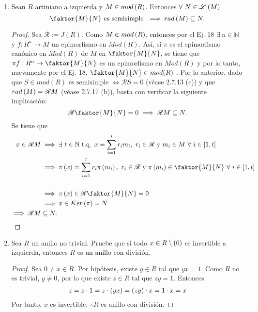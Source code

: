 \documentclass{article}
\begin{document}
\begin{enumerate}[label=\textbf{Ej \arabic*.}]
		\item Sean $R$ artiniano a izquierda y $M\in mod\left(R\right)$. Entonces
		$\forall\ N\in\genlin{M}$ 
		\begin{equation*}
			\faktor{M}{N}\text{ es semisimple }\implies rad\lrprth{M}\subseteq N.
		\end{equation*}
		\begin{proof}
			Sea $\mathscr{R}:=J(R)$. Como $M\in mod\left(R\right)$, entonces por el Ej. 18 $\exists\ n\in\mathbb{N}$ y $f:R^n\to M$ un epimorfismo en  $Mod(R)$. Así, sí $\pi$ es el epimorfismo canónico en $Mod(R)$ de $M$ en $\faktor{M}{N}$, se tiene que $\pi f:R^n\to \faktor{M}{N}$ es un epimorfismo en $Mod(R)$ y por lo tanto, nuevamente por el Ej. 18, $\faktor{M}{N}\in mod(R)$ . Por lo anterior, dado que $S\in mod(R)\text{ es semisimple }\iff \mathscr{R}S=0$ (véase 2.7.13 (c)) y que $rad\left(M\right)=\mathscr{R}M$ (véase 2.7.17 (b)), basta con verificar la siguiente implicación:
			\begin{equation*}
				\mathscr{R}\faktor{M}{N}=0\implies \mathscr{R} M\subseteq N.
			\end{equation*}
			Se tiene que
			\begin{align*}
				x\in\mathscr{R}M&\implies \exists\ t\in\mathbb{N}\text{ t.q. } x=\sum\limits_{i=1}^{t}r_im_i,\ r_i\in\mathscr{R}\text{ y } m_i\in M\ \forall\ i\in[1,t]\\
				&\implies \pi\lrprth{x}=\sum\limits_{i=1}^{t}r_i\pi\lrprth{m_i},\ r_i\in\mathscr{R}\text{ y } \pi\lrprth{m_i}\in \faktor{M}{N}\ \forall\ i\in[1,t]\\\\
				&\implies \pi\lrprth{x}\in\mathscr{R}\faktor{M}{N}=0\\
				&\implies x\in Ker\lrprth{\pi}=N.\\
				\implies \mathscr{R} M&\subseteq N.
			\end{align*}
		\end{proof}
		
		\item Sea $R$ un anillo no trivial. Pruebe que si todo $x \in R\setminus\left(0\right)$ es invertible a izquierda, entonces $R$ es un anillo con división.
		\begin{proof}
			Sea $0 \neq x \in R$. Por hipótesis, existe $y \in R$ tal que $yx=1$. Como $R$ no es trivial, $y \neq 0$, por lo que existe $z \in R$ tal que $zy=1$. Entonces
			\begin{align*}
				z=z \cdot 1=z \cdot \left(yx\right)=\left(zy\right) \cdot x=1 \cdot x=x
			\end{align*}
			Por tanto, $x$ es invertible. $\therefore R$ es anillo con división.
		\end{proof}
		

\end{enumerate}
\end{document}
